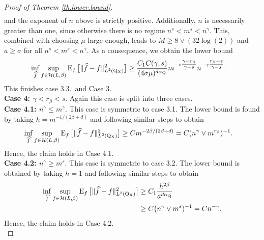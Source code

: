 \documentclass[10pt]{article}
\newcommand{\mH}{\mathcal{H}}
\newcommand{\E}{\operatorname{E}}
\newcommand{\Q}{\operatorname{Q}}
\newcommand{\wh}{\widehat}
\newcommand{\sX}{\mathrm{X}}
\begin{document}
\begin{proof}[Proof of Theorem \ref{th.lower.bound}]
\begin{align*}
    \end{align*}
    and the exponent of $n$ above is strictly positive. Additionally, $n$ is necessarily greater than one, since otherwise there is no regime $n^s < m^s < n^\gamma.$ This, combined with choosing $\mu$ large enough, leads to $M \geq 8\vee (32\log(2))$ and $a\geq \sigma$ for all $n^s < m^s < n^\gamma.$ As a consequence, we obtain the lower bound
    \begin{align*}
        \inf_{\wh f} \sup_{f \in \mH(L, \beta)}\E_{f}\big[\|\wh f - f\|_{L^2(\Q\mathstrut_{\!\sX})}^2\big] &\geq \frac{C_1 C(\gamma, s)}{(4\sigma\mu)^{d\alpha_{\Q}}}m^{-s\tfrac{\gamma - r_\beta}{\gamma - s}}n^{-\gamma\tfrac{r_\beta - s}{\gamma - s}}.
    \end{align*}
    This finishes case 3.3.\ and Case 3.\\
    
    \noindent\textbf{Case 4: $\gamma < r_\beta < s.$} Again this case is split into three cases.\\
    
    \noindent\textbf{Case 4.1: $n^{\gamma} \leq m^\gamma.$} This case is symmetric to case 3.1. The lower bound is found by taking $h = m^{-1/(2\beta + d)}$ and following similar steps to obtain
    \begin{align*}
        \inf_{\wh f} \sup_{f \in \mH(L, \beta)}\E_{f}\big[\|\wh f - f\|_{L^2(\Q\mathstrut_{\!\sX})}^2\big] &\geq C m^{-2\beta/(2\beta + d)} = C (n^{\gamma} \vee m^{r_\beta})^{-1}.
    \end{align*}
    Hence, the claim holds in Case 4.1.\\
    
    \noindent\textbf{Case 4.2: $n^\gamma \geq m^s.$} This case is symmetric to case 3.2. The lower bound is obtained by taking $h = 1$ and following similar steps to obtain
    \begin{align*}
        \inf_{\wh f} \sup_{f \in \mH(L, \beta)}\E_{f}\big[\|\wh f - f\|_{L^2(\Q\mathstrut_{\!\sX})}^2\big] &\geq C_1\frac{h^{2\beta}}{a^{d\alpha_{\Q}}}\\
        &\geq C \big(n^{\gamma}\vee m^{s})^{-1} = Cn^{-\gamma}.
    \end{align*}
    Hence, the claim holds in Case 4.2.\\
    

\end{proof}
\end{document}

